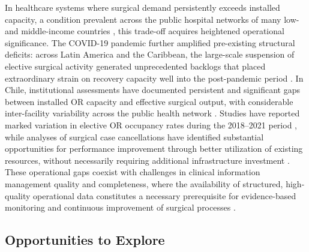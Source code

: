\documentclass[sn-mathphys-num]{sn-jnl}
\begin{document}
In healthcare systems where surgical demand persistently exceeds installed
capacity, a condition prevalent across the public hospital networks of many
low- and middle-income countries \cite{meara2015global}, this trade-off acquires
heightened operational significance. The COVID-19 pandemic further amplified
pre-existing structural deficits: across Latin America and the Caribbean, the
large-scale suspension of elective surgical activity generated unprecedented
backlogs that placed extraordinary strain on recovery capacity well into the
post-pandemic period \cite{campos2024examining}. In Chile, institutional assessments
have documented persistent and significant gaps between installed OR capacity
and effective surgical output, with considerable inter-facility variability
across the public health network \cite{aguilar2022como,de2020uso}.
Studies have reported marked variation in elective OR occupancy rates during
the 2018--2021 period \cite{barahona2023estimacion}, while analyses of surgical case
cancellations have identified substantial opportunities for performance
improvement through better utilization of existing resources, without
necessarily requiring additional infrastructure investment \cite{catalan2022suspensiones}.
These operational gaps coexist with challenges in clinical information
management quality and completeness, where the availability of structured,
high-quality operational data constitutes a necessary prerequisite for
evidence-based monitoring and continuous improvement of surgical processes
\cite{avendano2025chile,MINSAL2023}.

\subsection{Opportunities to Explore}
\end{document}
